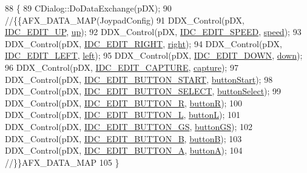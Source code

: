 \begin{DoxyCode}
88 \{
89   CDialog::DoDataExchange(pDX);
90   \textcolor{comment}{//\{\{AFX\_DATA\_MAP(JoypadConfig)}
91   DDX\_Control(pDX, \mbox{\hyperlink{resource_8h_ae0645e746a25d4d061e3fae80babcc78}{IDC\_EDIT\_UP}}, \mbox{\hyperlink{class_joypad_config_a65379815cbe3f6b1d63d6d6655be22dd}{up}});
92   DDX\_Control(pDX, \mbox{\hyperlink{resource_8h_a59a53c2540f84ff9094d9bfa68d22697}{IDC\_EDIT\_SPEED}}, \mbox{\hyperlink{class_joypad_config_a57365c2b56d24e6cf20d3586d692583d}{speed}});
93   DDX\_Control(pDX, \mbox{\hyperlink{resource_8h_ae29438ab510968afa9068e0c6b80ed57}{IDC\_EDIT\_RIGHT}}, \mbox{\hyperlink{class_joypad_config_ae941e8b6868e423b3c2bf4313c3c340f}{right}});
94   DDX\_Control(pDX, \mbox{\hyperlink{resource_8h_ae8bd1d3525011019fb5ff9406e0d2404}{IDC\_EDIT\_LEFT}}, \mbox{\hyperlink{class_joypad_config_a99c36e2559ce17f64aa004c37c5f8771}{left}});
95   DDX\_Control(pDX, \mbox{\hyperlink{resource_8h_a3c298d6303318c2193f262cfae3e413c}{IDC\_EDIT\_DOWN}}, \mbox{\hyperlink{class_joypad_config_ad42ffdfc61bb990382b0a35d15909644}{down}});
96   DDX\_Control(pDX, \mbox{\hyperlink{resource_8h_a9537127d26017dca3680b51458b4963b}{IDC\_EDIT\_CAPTURE}}, \mbox{\hyperlink{class_joypad_config_a82881a0174178e60d0a60a2b574fd385}{capture}});
97   DDX\_Control(pDX, \mbox{\hyperlink{resource_8h_a5db9e5ab3107d96db0fce4a54498232f}{IDC\_EDIT\_BUTTON\_START}}, \mbox{\hyperlink{class_joypad_config_a9083bf057d36c0fd78fe1976bee9fb74}{buttonStart}});
98   DDX\_Control(pDX, \mbox{\hyperlink{resource_8h_ac8953535a0ab3293fa3ae6aa107a6420}{IDC\_EDIT\_BUTTON\_SELECT}}, \mbox{\hyperlink{class_joypad_config_a79baa8f4d47b02dde3f032961e239556}{buttonSelect}});
99   DDX\_Control(pDX, \mbox{\hyperlink{resource_8h_aca900b079421856c84c22696e0054cf1}{IDC\_EDIT\_BUTTON\_R}}, \mbox{\hyperlink{class_joypad_config_ae8492d5da1c116da58dbaecc7572576b}{buttonR}});
100   DDX\_Control(pDX, \mbox{\hyperlink{resource_8h_af9887922000187e6cd392e1efd18a6ed}{IDC\_EDIT\_BUTTON\_L}}, \mbox{\hyperlink{class_joypad_config_a5a03e1bd6ea571aeeadfbaee7362830f}{buttonL}});
101   DDX\_Control(pDX, \mbox{\hyperlink{resource_8h_a622904a3fc8c117ae7e4c735a0506738}{IDC\_EDIT\_BUTTON\_GS}}, \mbox{\hyperlink{class_joypad_config_a4aa48681f17e03adced442271f29211f}{buttonGS}});
102   DDX\_Control(pDX, \mbox{\hyperlink{resource_8h_a4074668854c3737574e80ab8111d8207}{IDC\_EDIT\_BUTTON\_B}}, \mbox{\hyperlink{class_joypad_config_a8600f90f1074cda2ff14b73e6fc8e3d6}{buttonB}});
103   DDX\_Control(pDX, \mbox{\hyperlink{resource_8h_a743fd9ba2aa7e000f0d66a9deee5ff92}{IDC\_EDIT\_BUTTON\_A}}, \mbox{\hyperlink{class_joypad_config_a8b18405a6d92fbdca34cb1d1a6fcee2c}{buttonA}});
104   \textcolor{comment}{//\}\}AFX\_DATA\_MAP}
105 \}
\end{DoxyCode}
\mbox{\label{class_joypad_config_a1ff1e82beb3c0cb4363165277fabc796}} 
